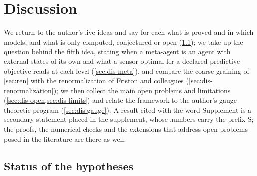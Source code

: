 \section{Discussion}\label{sec:dis}

We return to the author's five ideas and say for each what is proved and in which models, and what is only computed, conjectured or open (\cref{sec:dis-status}); we take up the question behind the fifth idea, stating when a meta-agent is an agent with external states of its own and what a sensor optimal for a declared predictive objective reads at each level (\cref{sec:dis-meta}), and compare the coarse-graining of \cref{sec:ren} with the renormalization of Friston and colleagues (\cref{sec:dis-renormalization}); we then collect the main open problems and limitations (\cref{sec:dis-open,sec:dis-limits}) and relate the framework to the author's gauge-theoretic program (\cref{sec:dis-gauge}). A result cited with the word Supplement is a secondary statement placed in the supplement, whose numbers carry the prefix S; the proofs, the numerical checks and the extensions that address open problems posed in the literature are there as well.

\subsection{Status of the hypotheses}\label{sec:dis-status}

